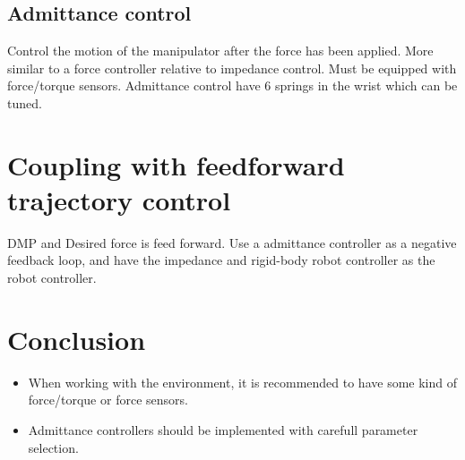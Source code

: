 \documentclass[a4paper]{article}
\begin{document}
\subsection{Admittance control}
Control the motion of the manipulator after the force has been applied. More similar to a force controller relative to impedance control. Must be equipped with force/torque sensors. Admittance control have 6 springs in the wrist which can be tuned. 

\section{Coupling with feedforward trajectory control}
DMP and Desired force is feed forward. Use a admittance controller as a negative feedback loop, and have the impedance and rigid-body robot controller as the robot controller. 


\section{Conclusion}
\begin{itemize}
	\item When working with the environment, it is recommended to have some kind of force/torque or force sensors. 
	\item Admittance controllers should be implemented with carefull parameter selection. 
\end{itemize}
\end{document}
